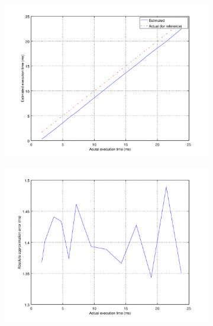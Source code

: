 \begin{figure}[ht!]
	\center
	\begin{subfigure}{0.8\linewidth}
	\center
	\includegraphics[width=\linewidth]{fig/midtaest.png}
	\end{subfigure}
	\begin{subfigure}{0.45\linewidth}
	\center
	\includegraphics[width=\linewidth]{fig/midabstaerr.png}
	\end{subfigure}
	\begin{subfigure}{0.45\linewidth}
	\center

\end{subfigure}
\end{figure}
